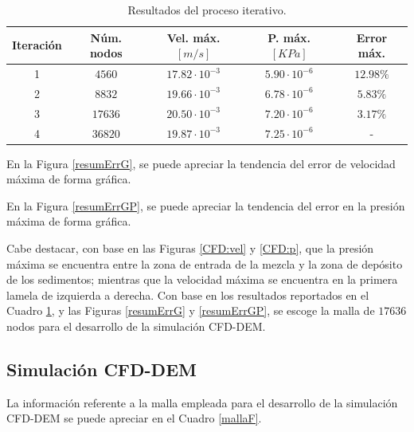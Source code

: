 \begin{table}[h!]
	\centering
	\begin{tabular}{|c|c|c|c|c|}
		\hline
		\textbf{Iteraci\'on} & \textbf{N\'um. nodos} & \textbf{Vel. m\'ax.$[m/s]$} & \textbf{P. m\'ax. $[KPa]$} & \textbf{Error m\'ax.} \\ \hline
		1 & $4560$ & $17.82 \cdot 10 ^{-3}$ & $5.90 \cdot 10 ^{-6}$ & $12.98 \%$ \\ \hline
		2 & $8832$ & $19.66 \cdot 10 ^{-3}$ & $6.78 \cdot 10 ^{-6}$ & $5.83 \%$ \\ \hline
		3 & $17636$ & $20.50 \cdot 10 ^{-3}$ & $ 7.20 \cdot 10 ^{-6}$ & $3.17 \%$ \\ \hline
		4 & $36820$ & $19.87 \cdot 10 ^{-3}$ & $7.25 \cdot 10 ^{-6}$ & - \\ \hline
	\end{tabular}
	\caption{Resultados del proceso iterativo.}
	\label{resumErr}
\end{table}

\noindent
\justify

En la Figura \ref{resumErrG}, se puede apreciar la tendencia del error de velocidad m\'axima de forma gr\'afica.



\noindent
\justify

En la Figura \ref{resumErrGP}, se puede apreciar la tendencia del error en la presi\'on m\'axima de forma gr\'afica.



\noindent
\justify

Cabe destacar, con base en las Figuras \ref{CFD:vel} y \ref{CFD:p}, que la presi\'on m\'axima se encuentra entre la zona de entrada de la mezcla y la zona de dep\'osito de los sedimentos; mientras que la velocidad m\'axima se encuentra en la primera lamela de izquierda a derecha. Con base en los resultados reportados en el Cuadro \ref{resumErr}, y las Figuras \ref{resumErrG} y \ref{resumErrGP}, se escoge la malla de $17636$ nodos para el desarrollo de la simulaci\'on CFD-DEM.

\subsection{Simulaci\'on CFD-DEM}

\noindent
\justify

La informaci\'on referente a la malla empleada para el desarrollo de la simulaci\'on CFD-DEM se puede apreciar en el Cuadro \ref{mallaF}.

